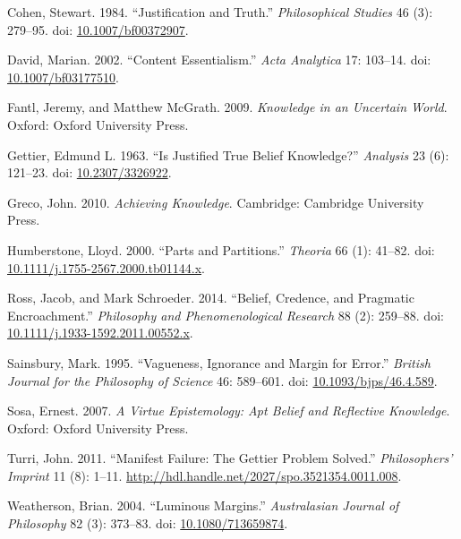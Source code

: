 \documentclass[
  10pt,
  letterpaper,
  DIV=11,
  numbers=noendperiod,
  twoside]{scrartcl}
\newlength{\cslhangindent}
\newenvironment{CSLReferences}[2] %
 {\begin{list}{}{%
  \setlength{\itemindent}{0pt}
  \setlength{\leftmargin}{0pt}
  \setlength{\parsep}{0pt}
  \ifodd #1
   \setlength{\leftmargin}{\cslhangindent}
   \setlength{\itemindent}{-1\cslhangindent}
  \fi
  \setlength{\itemsep}{#2\baselineskip}}}
 {\end{list}}
\begin{document}
\label{refs}
\begin{CSLReferences}{1}{0}
Cohen, Stewart. 1984. {``Justification and Truth.''} \emph{Philosophical
Studies} 46 (3): 279--95. doi:
\href{https://doi.org/10.1007/bf00372907}{10.1007/bf00372907}.

David, Marian. 2002. {``Content Essentialism.''} \emph{Acta Analytica}
17: 103--14. doi:
\href{https://doi.org/10.1007/bf03177510}{10.1007/bf03177510}.

Fantl, Jeremy, and Matthew McGrath. 2009. \emph{Knowledge in an
Uncertain World}. Oxford: Oxford University Press.

Gettier, Edmund L. 1963. {``Is Justified True Belief Knowledge?''}
\emph{Analysis} 23 (6): 121--23. doi:
\href{https://doi.org/10.2307/3326922}{10.2307/3326922}.

Greco, John. 2010. \emph{Achieving Knowledge}. Cambridge: Cambridge
University Press.

Humberstone, Lloyd. 2000. {``Parts and Partitions.''} \emph{Theoria} 66
(1): 41--82. doi:
\href{https://doi.org/10.1111/j.1755-2567.2000.tb01144.x}{10.1111/j.1755-2567.2000.tb01144.x}.

Ross, Jacob, and Mark Schroeder. 2014. {``Belief, Credence, and
Pragmatic Encroachment.''} \emph{Philosophy and Phenomenological
Research} 88 (2): 259--88. doi:
\href{https://doi.org/10.1111/j.1933-1592.2011.00552.x}{10.1111/j.1933-1592.2011.00552.x}.

Sainsbury, Mark. 1995. {``Vagueness, Ignorance and Margin for Error.''}
\emph{British Journal for the Philosophy of Science} 46: 589--601. doi:
\href{https://doi.org/10.1093/bjps/46.4.589}{10.1093/bjps/46.4.589}.

Sosa, Ernest. 2007. \emph{A Virtue Epistemology: Apt Belief and
Reflective Knowledge}. Oxford: Oxford University Press.

Turri, John. 2011. {``Manifest Failure: The Gettier Problem Solved.''}
\emph{Philosophers' Imprint} 11 (8): 1--11.
\url{http://hdl.handle.net/2027/spo.3521354.0011.008}.

Weatherson, Brian. 2004. {``Luminous Margins.''} \emph{Australasian
Journal of Philosophy} 82 (3): 373--83. doi:
\href{https://doi.org/10.1080/713659874}{10.1080/713659874}.


\end{CSLReferences}
\end{document}
